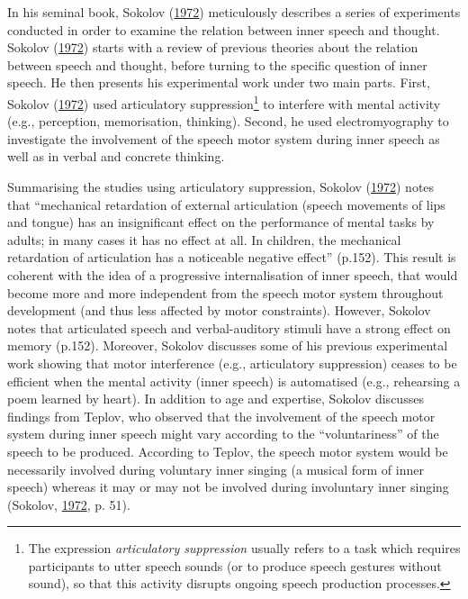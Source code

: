 \documentclass[a4paper,12pt,twoside,openright,oldfontcommands,final]{memoir}
\let\rmarkdownfootnote\footnote%
\def\footnote{\protect\rmarkdownfootnote}
\begin{document}
In his seminal book, Sokolov (\protect\hyperlink{ref-sokolov_inner_1972}{1972}) meticulously describes a series of experiments conducted in order to examine the relation between inner speech and thought. Sokolov (\protect\hyperlink{ref-sokolov_inner_1972}{1972}) starts with a review of previous theories about the relation between speech and thought, before turning to the specific question of inner speech. He then presents his experimental work under two main parts. First, Sokolov (\protect\hyperlink{ref-sokolov_inner_1972}{1972}) used articulatory suppression\footnote{The expression \emph{articulatory suppression} usually refers to a task which requires participants to utter speech sounds (or to produce speech gestures without sound), so that this activity disrupts ongoing speech production processes.} to interfere with mental activity (e.g., perception, memorisation, thinking). Second, he used electromyography to investigate the involvement of the speech motor system during inner speech as well as in verbal and concrete thinking.

Summarising the studies using articulatory suppression, Sokolov (\protect\hyperlink{ref-sokolov_inner_1972}{1972}) notes that \enquote{mechanical retardation of external articulation (speech movements of lips and tongue) has an insignificant effect on the performance of mental tasks by adults; in many cases it has no effect at all. In children, the mechanical retardation of articulation has a noticeable negative effect} (p.152). This result is coherent with the idea of a progressive internalisation of inner speech, that would become more and more independent from the speech motor system throughout development (and thus less affected by motor constraints). However, Sokolov notes that articulated speech and verbal-auditory stimuli have a strong effect on memory (p.152). Moreover, Sokolov discusses some of his previous experimental work showing that motor interference (e.g., articulatory suppression) ceases to be efficient when the mental activity (inner speech) is automatised (e.g., rehearsing a poem learned by heart). In addition to age and expertise, Sokolov discusses findings from Teplov, who observed that the involvement of the speech motor system during inner speech might vary according to the \enquote{voluntariness} of the speech to be produced. According to Teplov, the speech motor system would be necessarily involved during voluntary inner singing (a musical form of inner speech) whereas it may or may not be involved during involuntary inner singing (Sokolov, \protect\hyperlink{ref-sokolov_inner_1972}{1972}, p. 51).
\end{document}
